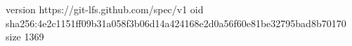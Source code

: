 version https://git-lfs.github.com/spec/v1
oid sha256:4e2c1151ff09b31a058f3b06d14a424168e2d0a56f60e81be32795bad8b70170
size 1369
